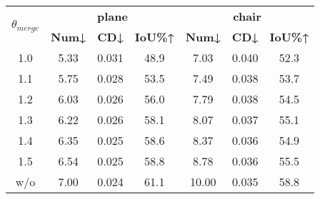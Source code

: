 \newcommand{\graycell}{\cellcolor[HTML]{EFEFEF}}
\newcommand{\redcell}{\cellcolor[HTML]{FAD1D0}}


\begin{tabular}{c|ccc|ccc}
\toprule
\multirow{2}{*}{\textbf{$\theta_{merge}$}} 
& \multicolumn{3}{c}{\textbf{plane}}               
& \multicolumn{3}{c}{\textbf{chair}}  \\
                                        
                                         & \textbf{Num↓}    & \textbf{CD↓}  & \textbf{IoU\%↑}  & \textbf{Num↓}    & \textbf{CD↓}  & \textbf{IoU\%↑}       \\
\midrule
1.0  & 5.33 & 0.031 & 48.9    & 7.03  & 0.040 & 52.3  \\
1.1  & 5.75 & 0.028 & 53.5    & 7.49  & 0.038 & 53.7  \\
1.2  & 6.03 & 0.026 & 56.0    & 7.79  & 0.038 & 54.5  \\
1.3  & 6.22 & 0.026 & 58.1    & 8.07  & 0.037 & 55.1  \\
1.4  & 6.35 & 0.025 & 58.6    & 8.37  & 0.036 & 54.9  \\    
1.5  & 6.54 & 0.025 & 58.8    & 8.78  & 0.036 & 55.5  \\
\midrule
w/o  & 7.00 & 0.024 & 61.1    & 10.00  & 0.035 & 58.8  \\
\bottomrule
\end{tabular}